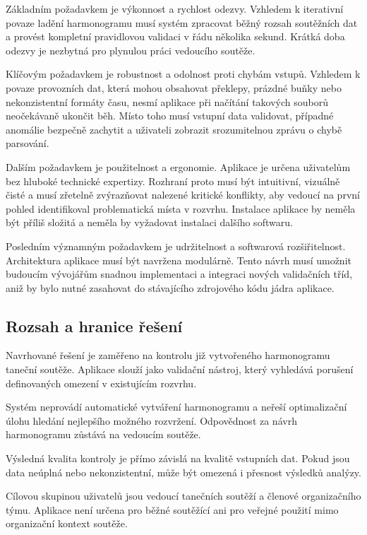 \documentclass[czech, kiv, ba, he, iso690alph, pdf]{fasthesis}
\begin{document}
				Základním požadavkem je výkonnost a rychlost odezvy. Vzhledem k iterativní povaze ladění harmonogramu musí systém zpracovat běžný rozsah soutěžních dat a provést kompletní pravidlovou validaci v řádu několika sekund. Krátká doba odezvy je nezbytná pro plynulou práci vedoucího soutěže.
			
				Klíčovým požadavkem je robustnost a odolnost proti chybám vstupů. Vzhledem k povaze provozních dat, která mohou obsahovat překlepy, prázdné buňky nebo nekonzistentní formáty času, nesmí aplikace při načítání takových souborů neočekávaně ukončit běh. Místo toho musí vstupní data validovat, případné anomálie bezpečně zachytit a uživateli zobrazit srozumitelnou zprávu o chybě parsování.
			
				Dalším požadavkem je použitelnost a ergonomie. Aplikace je určena uživatelům bez hluboké technické expertizy. Rozhraní proto musí být intuitivní, vizuálně čisté a musí zřetelně zvýrazňovat nalezené kritické konflikty, aby vedoucí na první pohled identifikoval problematická místa v rozvrhu. Instalace aplikace by neměla být příliš složitá a neměla by vyžadovat instalaci dalšího softwaru.
			
				Posledním významným požadavkem je udržitelnost a softwarová rozšiřitelnost. Architektura aplikace musí být navržena modulárně. Tento návrh musí umožnit budoucím vývojářům snadnou implementaci a integraci nových validačních tříd, aniž by bylo nutné zasahovat do stávajícího zdrojového kódu jádra aplikace.
	
	
	
			\subsection{Rozsah a hranice řešení}
			
				Navrhované řešení je zaměřeno na kontrolu již vytvořeného harmonogramu taneční soutěže. Aplikace slouží jako validační nástroj, který vyhledává porušení definovaných omezení v existujícím rozvrhu.
				
				Systém neprovádí automatické vytváření harmonogramu a neřeší optimalizační úlohu hledání nejlepšího možného rozvržení. Odpovědnost za návrh harmonogramu zůstává na vedoucím soutěže.
				
				Výsledná kvalita kontroly je přímo závislá na kvalitě vstupních dat. Pokud jsou data neúplná nebo nekonzistentní, může být omezená i přesnost výsledků analýzy.
				
				Cílovou skupinou uživatelů jsou vedoucí tanečních soutěží a členové organizačního týmu. Aplikace není určena pro běžné soutěžící ani pro veřejné použití mimo organizační kontext soutěže.
				
\end{document}
